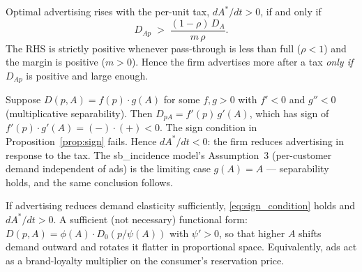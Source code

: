 \begin{proposition}\label{prop:sign}
Optimal advertising rises with the per-unit tax,
$dA^*/dt > 0$, if and only if
\begin{equation}\label{eq:sign_condition}
    D_{Ap}
    \;>\;
    \frac{(1 - \rho)\, D_A}{m \, \rho}.
\end{equation}
The RHS is strictly positive whenever pass-through is
less than full ($\rho < 1$) and the margin is positive
($m > 0$). Hence the firm advertises more after a tax
\emph{only if} $D_{Ap}$ is positive and large enough.
\end{proposition}

%
%

\begin{corollary}
\label{cor:separable}
Suppose $D(p, A) = f(p) \cdot g(A)$ for some $f, g > 0$
with $f' < 0$ and $g'' < 0$ (multiplicative separability).
Then $D_{pA} = f'(p)\, g'(A)$, which has sign of $f'(p)
\cdot g'(A) = (-) \cdot (+) < 0$. The sign condition in
Proposition~\ref{prop:sign} fails. Hence $dA^*/dt < 0$:
the firm reduces advertising in response to the tax.
The sb\_incidence model's Assumption~3 (per-customer
demand independent of ads) is the limiting case
$g(A) = A$ — separability holds, and the same
conclusion follows.
\end{corollary}

\begin{corollary}
\label{cor:persuasive}
If advertising reduces demand elasticity sufficiently,
\eqref{eq:sign_condition} holds and $dA^*/dt > 0$. A
sufficient (not necessary) functional form: $D(p, A) =
\phi(A) \cdot D_0(p / \psi(A))$ with $\psi' > 0$, so
that higher $A$ shifts demand outward and rotates it
flatter in proportional space. Equivalently, ads act
as a brand-loyalty multiplier on the consumer's
reservation price.
\end{corollary}


